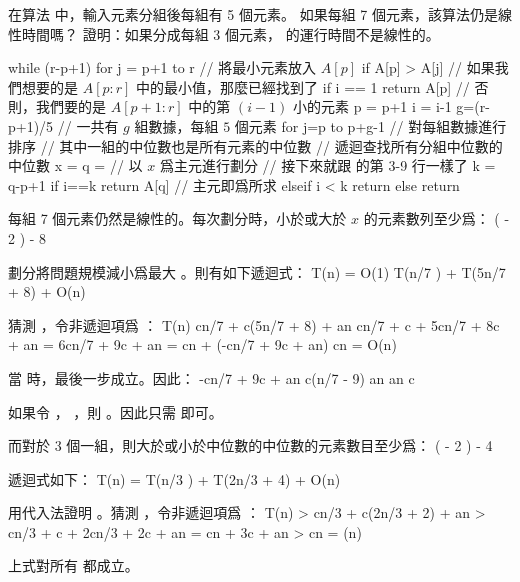 
\startEXERCISE[exercise:9_3_1]
在算法  中，輸入元素分組後每組有 5 個元素。
如果每組 7 個元素，該算法仍是線性時間嗎？
證明：如果分成每組 3 個元素，  的運行時間不是線性的。

\startCLRSCODE
while (r-p+1)  
	for j = p+1 to r	// 將最小元素放入 $A[p]$
		if A[p] > A[j]
	// 如果我們想要的是 $A[p:r]$ 中的最小值，那麼已經找到了
	if i == 1
		return A[p]
	// 否則，我們要的是 $A[p+1:r]$ 中的第 $(i-1)$ 小的元素
	p = p+1
	i = i-1
g=(r-p+1)/5	// 一共有 $g$ 組數據，每組 $5$ 個元素
for j=p to p+g-1	// 對每組數據進行排序
// 其中一組的中位數也是所有元素的中位數
// 遞迴查找所有分組中位數的中位數
x = 
q = 	// 以 $x$ 爲主元進行劃分
// 接下來就跟  的第 3-9 行一樣了
k = q-p+1
if i==k
	return A[q]	// 主元即爲所求
elseif i < k
	return 
else
	return 
\stopCLRSCODE
\stopEXERCISE

\startANSWER
每組 7 個元素仍然是線性的。每次劃分時，小於或大於 $x$ 的元素數列至少爲：
 \left(\left\lceil {} \left\lceil {} \right\rceil \right\rceil
           - 2 \right) \ge {} - 8
\stopformula

劃分將問題規模減小爲最大 。則有如下遞迴式：
\startformula
T(n) = \startmathcases
 \NC O(1) \NC {} \NR
 \NC T(\lceil n/7 \rceil) + T(5n/7 + 8) + O(n) \NC {} \NR
\stopmathcases
\stopformula

猜測 ，令非遞迴項爲 ：
\startsplitformula\startmathalignment
\NC T(n) \NC \le c\lceil n/7 \rceil + c(5n/7 + 8) + an \NR
\NC \NC \le cn/7 + c + 5cn/7 + 8c + an \NR
\NC \NC = 6cn/7 + 9c + an \NR
\NC \NC = cn + (-cn/7 + 9c + an) \NR
\NC \NC \le cn \NR
\NC \NC = O(n) \NR
\stopmathalignment\stopsplitformula

當  時，最後一步成立。因此：
\startsplitformula\startmathalignment[n=1]
\NC -cn/7 + 9c + an  \NR
\NC \Downarrow \NR
\NC c(n/7 - 9) \ge an \NR
\NC \Downarrow \NR
\NC {} \ge an \NR
\NC \Downarrow \NR
\NC c \ge {} \NR
\stopmathalignment\stopsplitformula

如果令 ， ，則 。因此只需  即可。

而對於 3 個一組，則大於或小於中位數的中位數的元素數目至少爲：
 \left(\left\lceil {} \left\lceil {} \right\rceil \right\rceil
           - 2 \right) \ge {} - 4
\stopformula

遞迴式如下：
\startformula
T(n) = T(\lceil n/3 \rceil) + T(2n/3 + 4) + O(n)
\stopformula

用代入法證明 。猜測 ，令非遞迴項爲 ：
\startsplitformula\startmathalignment
\NC T(n) \NC > c\lceil n/3 \rceil + c(2n/3 + 2) + an \NR
\NC \NC > cn/3 + c + 2cn/3 + 2c + an \NR
\NC \NC = cn + 3c + an \NR
\NC \NC > cn \NR
\NC \NC = \omega(n) \NR
\stopmathalignment\stopsplitformula

上式對所有  都成立。
\stopANSWER
